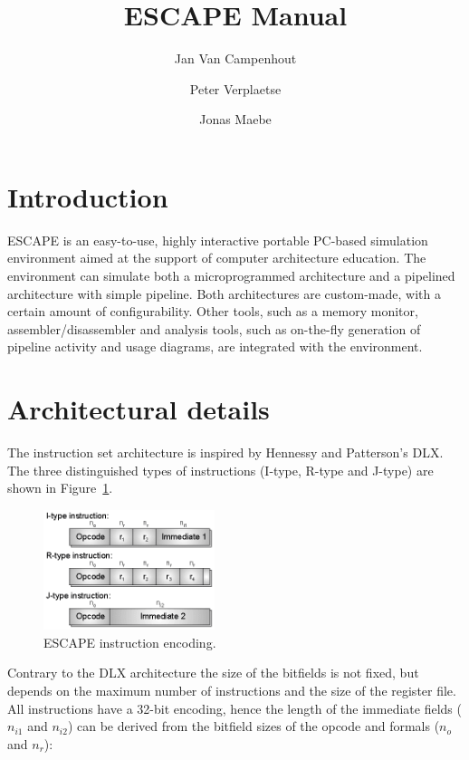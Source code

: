 \documentclass{article}
\begin{document}
\title{ESCAPE Manual}
\author{Jan Van Campenhout \and Peter Verplaetse \and Jonas Maebe}

\maketitle

\section{Introduction}
ESCAPE is an 
easy-to-use, highly interactive portable PC-based simulation environment
 aimed at the support of computer architecture education. The 
environment can simulate both a microprogrammed architecture and a 
pipelined architecture with simple pipeline. Both architectures are 
custom-made, with a certain amount of configurability. Other tools, such
 as a memory monitor, assembler/disassembler and analysis tools, such as
 on-the-fly generation of pipeline activity and usage diagrams, are 
integrated with the environment.

\section{Architectural details}
The instruction set architecture is inspired by Hennessy and Patterson's
 DLX. The three distinguished types of instructions (I-type, R-type and 
J-type) are shown in Figure~\ref{fig:encoding}.

\begin{figure}
\centering
\includegraphics[width=5cm]{graphics/encoding.png}
\caption{ESCAPE instruction encoding.}
\label{fig:encoding}
\end{figure}

Contrary to the DLX architecture the size of the bitfields is not fixed,
 but depends on the maximum number of instructions and the size of the 
register file. All instructions have a 32-bit encoding, hence the length
 of the immediate fields ($n_{i1}$ and $n_{i2}$) can be derived from the bitfield sizes of the opcode and formals ($n_{o}$ and $n_{r}$):
\end{document}
